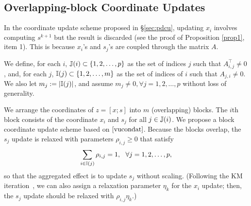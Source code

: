 {{\subsection{Overlapping-block Coordinate Updates}
{In the coordinate update scheme proposed in \S\ref{sec:pdcu}, updating $x_i$ involves computing $s^{k+1}$ but the result is discarded (see the proof of Proposition \ref{prop1}, item 1). This is because $x_i$'s and $s_j$'s are coupled through the matrix $A$.

We define, for each $i$,  $\mathbb{J}(i)\subset \{1,2,\ldots, p\}$ as the set of indices $ j$ such that $A^\top_{i,j}\neq 0$, and, for each $j$,  $\mathbb{I}(j)\subset\{1,2,\ldots,m\}$ as the set of indices of $i$ such that $A_{j,i}\neq 0$. We also let $m_j:=|\mathbb{I}(j)|$, and assume $m_j\neq 0,\forall j=1,2,\ldots, p$ without loss of generality.

We arrange the coordinates of $z=[x;s]$ into $m$ (overlapping) blocks. The $i$th block consists of the coordinate $x_i$ and  $s_j$ for all $j\in\mathbb{J}(i)$. We propose a block coordinate update scheme based on $\eqref{vucondat}$. Because the blocks overlap, the $s_j$ update is relaxed with parameters $\rho_{i,j}\ge 0$ that satisfy  $$\sum_{i\in \mathbb{I}(j)}\rho_{i,j}=1,~~\forall j=1,2,\ldots, p,$$ so that the aggregated effect is to update $s_j$ without scaling. (Following the
KM iteration~\cite{krasnosel1955two}, we can also assign a relaxation parameter $\eta_k$ for the $x_i$ update; then, the $s_j$ update should be relaxed with $\rho_{i,j}\eta_k$.)

}}}
